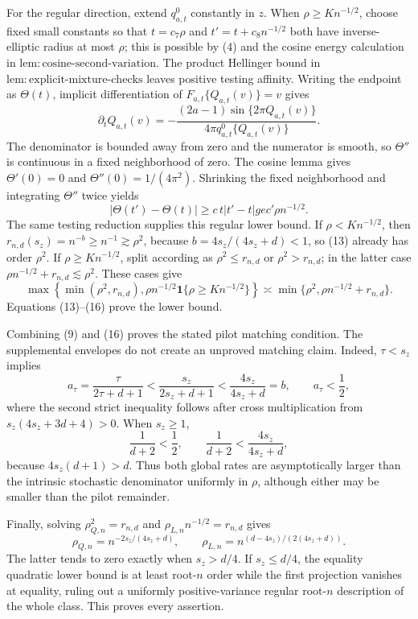 For the regular direction, extend \(q_{a,t}^{0}\) constantly in \(z\). When \(\rho\ge K n^{-1/2}\), choose fixed small constants so that \(t=c_7\rho\) and \(t'=t+c_8n^{-1/2}\) both have inverse-elliptic radius at most \(\rho\); this is possible by (4) and the cosine energy calculation in \(\mathrm{lem{:}cosine\text{-}second\text{-}variation}\). The product Hellinger bound in \(\mathrm{lem{:}explicit\text{-}mixture\text{-}checks}\) leaves positive testing affinity. Writing the endpoint as \(\Theta(t)\), implicit differentiation of \(F_{a,t}\{Q_{a,t}(v)\}=v\) gives
\[
\partial_tQ_{a,t}(v)
=-\frac{(2a-1)\sin\{2\pi Q_{a,t}(v)\}}
{4\pi q_{a,t}^{0}\{Q_{a,t}(v)\}}.                                \tag{14}
\]
The denominator is bounded away from zero and the numerator is smooth, so \(\Theta''\) is continuous in a fixed neighborhood of zero. The cosine lemma gives \(\Theta'(0)=0\) and \(\Theta''(0)=1/(4\pi^2)\). Shrinking the fixed neighborhood and integrating \(\Theta''\) twice yields
\[
|\Theta(t')-\Theta(t)|\ge c\,t|t'-t|ge c'\rho n^{-1/2}.          \tag{15}
\]
The same testing reduction supplies this regular lower bound. If \(\rho<K n^{-1/2}\), then \(r_{n,d}(s_z)=n^{-b}\ge n^{-1}\gtrsim\rho^2\), because \(b=4s_z/(4s_z+d)<1\), so (13) already has order \(\rho^2\). If \(\rho\ge K n^{-1/2}\), split according as \(\rho^2\le r_{n,d}\) or \(\rho^2>r_{n,d}\); in the latter case \(\rho n^{-1/2}+r_{n,d}\lesssim\rho^2\). These cases give
\[
\max\!\left\{\min(\rho^2,r_{n,d}),\rho n^{-1/2}\mathbf1\{\rho\ge K n^{-1/2}\}\right\}
\asymp\min\{\rho^2,\rho n^{-1/2}+r_{n,d}\}.                     \tag{16}
\]
Equations (13)--(16) prove the lower bound.

Combining (9) and (16) proves the stated pilot matching condition. The supplemental envelopes do not create an unproved matching claim. Indeed, \(\tau<s_z\) implies
\[
a_\tau=\frac{\tau}{2\tau+d+1}
<\frac{s_z}{2s_z+d+1}
<\frac{4s_z}{4s_z+d}=b,
\qquad a_\tau<\frac12,                                             \tag{17}
\]
where the second strict inequality follows after cross multiplication from \(s_z(4s_z+3d+4)>0\). When \(s_z\ge1\),
\[
\frac1{d+2}<\frac12,
\qquad
\frac1{d+2}<\frac{4s_z}{4s_z+d},                                  \tag{18}
\]
because \(4s_z(d+1)>d\). Thus both global rates are asymptotically larger than the intrinsic stochastic denominator uniformly in \(\rho\), although either may be smaller than the pilot remainder.

Finally, solving \(\rho_{Q,n}^2=r_{n,d}\) and \(\rho_{L,n}n^{-1/2}=r_{n,d}\) gives
\[
\rho_{Q,n}=n^{-2s_z/(4s_z+d)},
\qquad
\rho_{L,n}=n^{(d-4s_z)/(2(4s_z+d))}.                               \tag{19}
\]
The latter tends to zero exactly when \(s_z>d/4\). If \(s_z\le d/4\), the equality quadratic lower bound is at least root-\(n\) order while the first projection vanishes at equality, ruling out a uniformly positive-variance regular root-\(n\) description of the whole class. This proves every assertion.